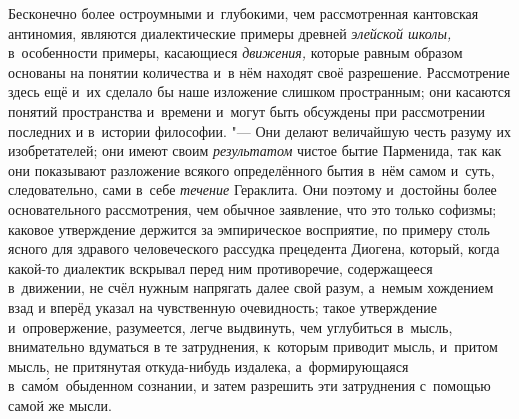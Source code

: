 Бесконечно более остроумными и~глубокими, чем рассмотренная кантовская
антиномия, являются диалектические примеры древней {\em элейской школы,}
в~особенности примеры, касающиеся {\em движения,} которые равным образом основаны
на понятии количества и~в нём находят своё разрешение. Рассмотрение здесь
ещё и~их сделало бы наше изложение слишком пространным; они касаются понятий
пространства и~времени и~могут быть обсуждены при рассмотрении последних и
в~истории философии. "--- Они делают величайшую честь разуму их изобретателей;
они имеют своим {\em результатом} чистое бытие Парменида, так как они
показывают разложение всякого определённого бытия в~нём самом и~суть,
следовательно, сами в~себе {\em течение} Гераклита. Они поэтому и~достойны
более основательного рассмотрения, чем обычное заявление, что это только
софизмы; каковое утверждение держится за эмпирическое восприятие, по примеру
столь ясного для здравого человеческого рассудка прецедента Диогена, который,
когда какой-то диалектик вскрывал перед ним противоречие, содержащееся
в~движении, не счёл нужным напрягать далее свой разум, а~немым хождением взад
и вперёд указал на чувственную очевидность; такое утверждение и~опровержение,
разумеется, легче выдвинуть, чем углубиться в~мысль, внимательно вдуматься
в те затруднения, к~которым приводит мысль, и~притом мысль, не притянутая
откуда-нибудь издалека, а~формирующаяся в~сам\'{о}м~обыденном сознании,
и затем разрешить эти затруднения с~помощью самой же мысли.

